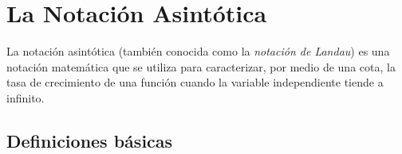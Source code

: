
\chapter{La Notación Asintótica}

La notación asintótica (también conocida como la \emph{notación de
Landau}) es una notación matemática que se utiliza para caracterizar,
por medio de una cota, la tasa de crecimiento de una función cuando
la variable independiente tiende a infinito.

\section{Definiciones básicas}

